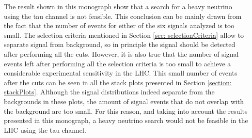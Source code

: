 The result shown in this monograph show that a search for a heavy neutrino using the tau channel is not feasible. This conclusion can be mainly drawn from the fact that the number of events for either of the six signals analyzed is too small. The selection criteria mentioned in Section \ref{sec: selectionCriteria} allow to separate signal from background, so in principle the signal should be detected after performing all the cuts. However, it is also true that the number of signal events left after performing all the selection criteria is too small to achieve a considerable experimental sensitivity in the LHC. This small number of events after the cuts can be seen in all the stack plots presented in Section \ref{section: stackPlots}. Although the signal distributions indeed separate from the backgrounds in these plots, the amount of signal events that do not overlap with the background are too small. For this reason, and taking into account the results presented in this monograph, a heavy neutrino search would not be feasible in the LHC using the tau channel.
